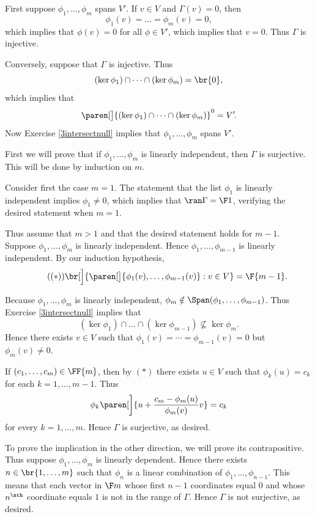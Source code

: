 \begin{Solution}
\begin{subtheorem}
\item
First suppose $\phi_1, \dots, \phi_m$ spans $V'\!$. If $v \in V$ and $\Gamma(v) = 0$, then
\[
\phi_1(v) = \dots = \phi_m(v) = 0,
\]
which implies that $\phi(v) = 0$ for all $\phi \in V'\!$, which implies that $v = 0$. Thus $\Gamma$ is injective.

Conversely, suppose that $\Gamma$ is injective. Thus
\[
(\ker \phi_1) \cap \cdots \cap (\ker \phi_m) = \br{0},
\]
which implies that
\[
\paren[\big]{ (\ker \phi_1) \cap \cdots \cap (\ker \phi_m) }^0 = V'\!.
\]
Now Exercise \ref{3intersectnull} implies that $\phi_1, \dots, \phi_m$ spans $V'\!$.

\item
First we will prove that if $\phi_1, \dots, \phi_m$ is linearly independent, then $\Gamma$ is surjective. This will be done by induction on $m$.

Consider first the case $m = 1$. The statement that the list $\phi_1$ is linearly independent implies $\phi_1 \ne 0$, which implies that $\ran \Gamma = \F1$, verifying the desired statement when $m = 1$.

Thus assume that $m>1$ and that the desired statement holds for $m-1$. Suppose $\phi_1, \dots, \phi_m$ is linearly independent. Hence $\phi_1, \dots, \phi_{m-1}$ is linearly independent. By our induction hypothesis,
\[ \tag{$(*)$}
\br[\Big]{ \paren[\big]{ \phi_1(v), \ldots, \phi_{m-1}(v) } : v \in V} = \F{m-1} .
\]

Because $\phi_1, \dots, \phi_m$ is linearly independent, $\phi_m \notin \Span(\phi_1, \ldots, \phi_{m-1})$. Thus Exercise \ref{3intersectnull} implies that
\[
(\ker \phi_1) \cap \dots \cap (\ker \phi_{m-1}) \nsubseteq \ker \phi_m.
\]
Hence there exists $v \in V$ such that $\phi_1(v) = \cdots = \phi_{m-1}(v) = 0$ but $\phi_m(v) \ne 0$.

If $(c_1, \ldots, c_m) \in \FF{m}$, then by $(*)$ there exists $u \in V$ such that $\phi_k(u) = c_k$ for each $k = 1, \ldots, m-1$. Thus
\[
\phi_k\paren[\bigg]{u + \frac{c_m - \phi_m(u)}{\phi_m(v)}v} = c_k
\]
for every $k = 1, \ldots, m$. Hence $\Gamma$ is surjective, as desired.

To prove the implication in the other direction, we will prove its contrapositive. Thus suppose $\phi_1, \ldots, \phi_m$ is linearly dependent. Hence there exists $n \in \br{1, \ldots, m}$ such that $\phi_n$ is a linear combination of $\phi_1, \ldots, \phi_{n-1}$. This means that each vector in $\F m$ whose first $n-1$ coordinates equal $0$ and whose $n^\nth$ coordinate equals $1$ is not in the range of $\Gamma$. Hence $\Gamma$ is not surjective, as desired.
\end{subtheorem}
\end{Solution}

